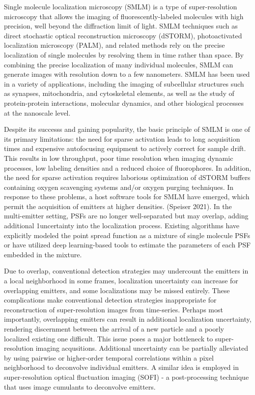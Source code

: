 \documentclass{ucetd}
\begin{document}
Single molecule localization microscopy (SMLM) is a type of super-resolution microscopy that allows the imaging of fluorescently-labeled molecules with high precision, well beyond the diffraction limit of light. SMLM techniques such as direct stochastic optical reconstruction microscopy (dSTORM), photoactivated localization microscopy (PALM), and related methods rely on the precise localization of single molecules by resolving them in time rather than space. By combining the precise localization of many individual molecules, SMLM can generate images with resolution down to a few nanometers. SMLM has been used in a variety of applications, including the imaging of subcellular structures such as synapses, mitochondria, and cytoskeletal elements, as well as the study of protein-protein interactions, molecular dynamics, and other biological processes at the nanoscale level.

Despite its successs and gaining popularity, the basic principle of SMLM is one of its primary limitations: the need for sparse activation leads to long acquisition times and expensive autofocusing equipment to actively correct for sample drift. This results in low throughput, poor time resolution when imaging dynamic processes, low labeling densities and a reduced choice of fluorophores. In addition, the need for sparse activation requires laborious optimization of dSTORM buffers containing oxygen scavenging systems and/or oxygen purging techniques. In response to these problems, a host software tools for SMLM have emerged, which permit the acquisition of emitters at higher densities. (Speiser 2021). In the multi-emitter setting, PSFs are no longer well-separated but may overlap, adding additional 1uncertainty into the localization process. Existing algorithms have explicitly modeled the point spread function as a mixture of single molecule PSFs or have utilized deep learning-based tools to estimate the parameters of each PSF embedded in the mixture.  

Due to overlap, conventional detection strategies may undercount the emitters in a local neighborhood in some frames, localization uncertainty can increase for overlapping emitters, and some localizations may be missed entirely. These complications make conventional detection strategies inappropriate for reconstruction of super-resolution images from time-series. Perhaps most importantly, overlapping emitters can result in additional localization uncertainty, rendering discernment between the arrival of a new particle and a poorly localized existing one difficult. This issue poses a major bottleneck to super-resolution imaging acqusitions. Additional uncertainty can be partially alleviated by using pairwise or higher-order temporal correlations within a pixel neighborhood to deconvolve individual emitters. A similar idea is employed in super-resolution optical fluctuation imaging (SOFI) - a post-processing technique that uses image cumulants to deconvolve emitters. 
\end{document}
